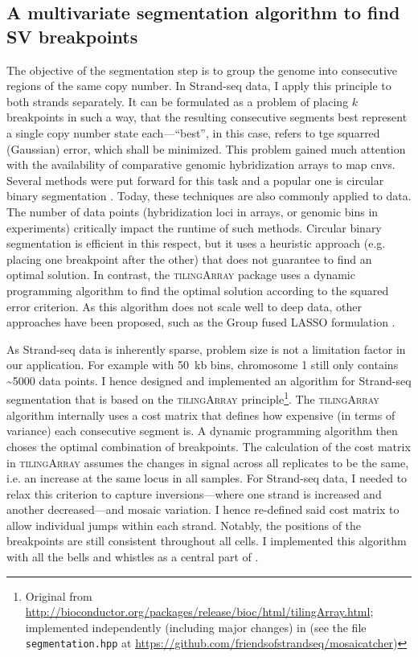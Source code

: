 \subsection{A multivariate segmentation algorithm to find SV breakpoints}
\label{sec:mosaic_segmentation}

The objective of the segmentation step is to group the genome into consecutive regions of
the same copy number. In Strand-seq data, I apply this principle to both strands
separately. It can be formulated as a problem of placing $k$
breakpoints in such a way, that the resulting consecutive segments best
represent a single copy number state each---``best'', in this case, refers to
tge squarred (Gaussian) error, which shall be minimized. This problem gained much attention with the
availability of comparative genomic hybridization arrays to map \acp{cnv}.
Several methods were put forward for this task and a popular one is circular
binary segmentation \citep{Olshen2004,Venkatraman2007}. Today, these techniques
are also commonly applied to \mps data. The number of data points (hybridization
loci in arrays, or genomic bins in \mps experiments) critically impact the
runtime of such methods. Circular binary segmentation is efficient in this
respect, but it uses a heuristic approach (e.g. placing one breakpoint after the
other) that does not guarantee to find an optimal solution. In contrast, the
\textsc{tilingArray} \citep{Huber2006} package uses a dynamic programming
algorithm to find the optimal solution according to the squared error criterion.
As this algorithm does not scale well to deep \mps data, other approaches have
been proposed, such as the Group fused LASSO formulation \citep{Bleakley2011}.

As Strand-seq data is inherently sparse, problem size is not a limitation factor
in our application. For example with 50~kb bins, chromosome 1 still only
contains \textasciitilde5000 data points. I hence designed and implemented an
algorithm for Strand-seq segmentation that is based on the \textsc{tilingArray}
principle\footnote{Original from \url{http://bioconductor.org/packages/release/bioc/html/tilingArray.html};
    implemented independently (including major changes) in \mc (see the file
    \texttt{segmentation.hpp} at \url{https://github.com/friendsofstrandseq/mosaicatcher})}.
The \textsc{tilingArray} algorithm internally uses a cost matrix that defines
how expensive (in terms of variance) each consecutive segment is. A dynamic
programming algorithm then choses the optimal combination of breakpoints. The
calculation of the cost matrix in \textsc{tilingArray} assumes the changes in
signal across all replicates to be the same, i.e. an increase at the same locus
in all samples. For Strand-seq data, I needed to relax this criterion to capture
inversions---where one strand is increased and another decreased---and mosaic
variation. I hence re-defined said cost matrix to allow individual jumps within
each strand. Notably, the positions of the breakpoints are still consistent
throughout all cells. I implemented this algorithm with all the bells and
whistles as a central part of \mc.





